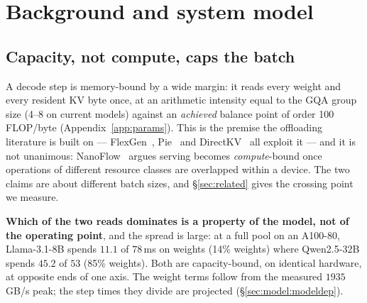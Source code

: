 %
%

\section{Background and system model}
\label{sec:background}

\subsection{Capacity, not compute, caps the batch}
\label{sec:background:capacity}

A decode step is memory-bound by a wide margin: it reads every weight and every
resident KV byte once, at an arithmetic intensity equal to the GQA group size
(4--8 on current models) against an \emph{achieved} balance point of order 100
FLOP/byte (Appendix~\ref{app:params}). This is the premise the offloading
literature is built on --- FlexGen~\cite{flexgen}, Pie~\cite{pie} and
DirectKV~\cite{directkv} all exploit it --- and it is not unanimous:
NanoFlow~\cite{nanoflow} argues serving becomes \emph{compute}-bound once
operations of different resource classes are overlapped within a device. The two
claims are about different batch sizes, and \S\ref{sec:related} gives the
crossing point we measure.

\textbf{Which of the two reads dominates is a property of the model, not of the
operating point}, and the spread is large: at a full pool on an A100-80,
Llama-3.1-8B spends $11.1$ of $78$\,ms on weights (14\% weights) where
Qwen2.5-32B spends $45.2$ of $53$ (85\% weights). Both are capacity-bound, on
identical hardware, at opposite ends of one axis. The weight terms follow from the
measured $1935$\,GB/s peak; the step times they divide are projected
(\S\ref{sec:model:modeldep}).

